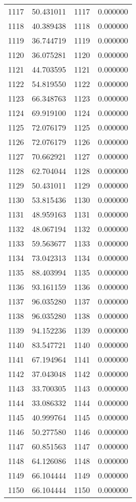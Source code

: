 \documentclass[12pt]{article}
\begin{document}
\begin{longtable}{@{}cccc@{}}
1117 & 50.431011 & 1117 & 0.000000 \\
1118 & 40.389438 & 1118 & 0.000000 \\
1119 & 36.744719 & 1119 & 0.000000 \\
1120 & 36.075281 & 1120 & 0.000000 \\
1121 & 44.703595 & 1121 & 0.000000 \\
1122 & 54.819550 & 1122 & 0.000000 \\
1123 & 66.348763 & 1123 & 0.000000 \\
1124 & 69.919100 & 1124 & 0.000000 \\
1125 & 72.076179 & 1125 & 0.000000 \\
1126 & 72.076179 & 1126 & 0.000000 \\
1127 & 70.662921 & 1127 & 0.000000 \\
1128 & 62.704044 & 1128 & 0.000000 \\
1129 & 50.431011 & 1129 & 0.000000 \\
1130 & 53.815436 & 1130 & 0.000000 \\
1131 & 48.959163 & 1131 & 0.000000 \\
1132 & 48.067194 & 1132 & 0.000000 \\
1133 & 59.563677 & 1133 & 0.000000 \\
1134 & 73.042313 & 1134 & 0.000000 \\
1135 & 88.403994 & 1135 & 0.000000 \\
1136 & 93.161159 & 1136 & 0.000000 \\
1137 & 96.035280 & 1137 & 0.000000 \\
1138 & 96.035280 & 1138 & 0.000000 \\
1139 & 94.152236 & 1139 & 0.000000 \\
1140 & 83.547721 & 1140 & 0.000000 \\
1141 & 67.194964 & 1141 & 0.000000 \\
1142 & 37.043048 & 1142 & 0.000000 \\
1143 & 33.700305 & 1143 & 0.000000 \\
1144 & 33.086332 & 1144 & 0.000000 \\
1145 & 40.999764 & 1145 & 0.000000 \\
1146 & 50.277580 & 1146 & 0.000000 \\
1147 & 60.851563 & 1147 & 0.000000 \\
1148 & 64.126086 & 1148 & 0.000000 \\
1149 & 66.104444 & 1149 & 0.000000 \\
1150 & 66.104444 & 1150 & 0.000000 \\

\end{longtable}
\end{document}
